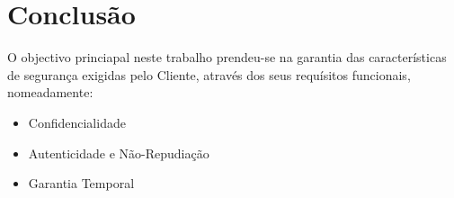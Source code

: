 \clearpage
\newpage

\chapter{Conclusão}
\label{chapter:conclusions}

O objectivo princiapal neste trabalho prendeu-se na garantia das características de segurança exigidas pelo Cliente, através dos seus requísitos funcionais, nomeadamente:
\begin{itemize}
\item Confidencialidade
\item Autenticidade e Não-Repudiação
\item Garantia Temporal
\end{itemize}

